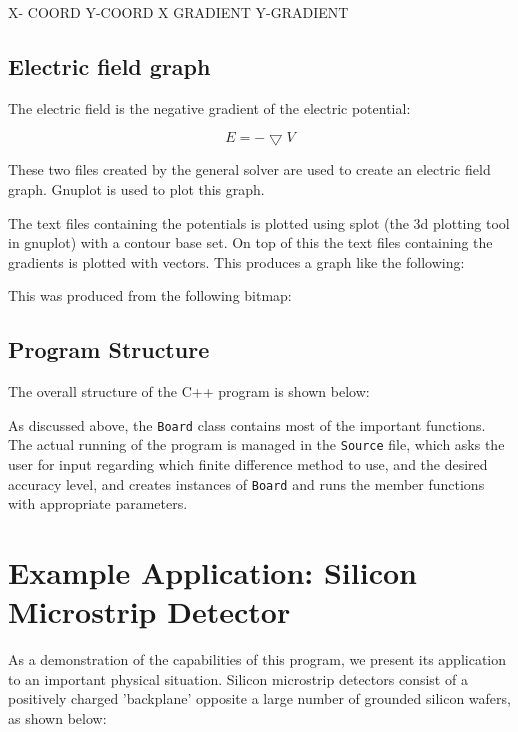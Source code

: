 \documentclass{article}
\begin{document}
X- COORD                    Y-COORD          X GRADIENT          Y-GRADIENT

\subsection{Electric field graph}

The electric field is the negative gradient of the electric potential:

\begin{equation} E=-\bigtriangledown V \end{equation}

These two files created by the general solver are used to create an electric field graph. Gnuplot is used to plot this graph.

The text files containing the potentials is plotted using splot (the 3d plotting tool in gnuplot) with a contour base set. On top of this the text files containing the gradients is plotted with vectors. This produces a graph like the following:


This was produced from the following bitmap:




\subsection{Program Structure}
The overall structure of the C++ program is shown below:


As discussed above, the \texttt{Board} class contains most of the important functions. The actual running of the program is managed in the \texttt{Source} file, which asks the user for input regarding which finite difference method to use, and the desired accuracy level, and creates instances of \texttt{Board} and runs the member functions with appropriate parameters.


\section{Example Application: Silicon Microstrip Detector}
As a demonstration of the capabilities of this program, we present its application to an important physical situation. Silicon microstrip detectors consist of a positively charged 'backplane' opposite a large number of grounded silicon wafers, as shown below:

\end{document}
